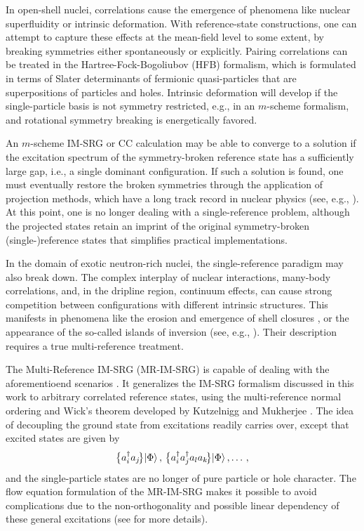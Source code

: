 In open-shell nuclei, correlations cause the emergence of phenomena
like nuclear superfluidity or intrinsic deformation. With
reference-state constructions, one can attempt to capture these
effects at the mean-field level to some extent, by breaking symmetries
either spontaneously or explicitly. Pairing correlations can be
treated in the Hartree-Fock-Bogoliubov (HFB) formalism, which is
formulated in terms of Slater determinants of fermionic
quasi-particles that are superpositions of particles and
holes. Intrinsic deformation will develop if the single-particle basis
is not symmetry restricted, e.g., in an $m$-scheme formalism, and
rotational symmetry breaking is energetically favored.

An $m$-scheme IM-SRG or CC calculation may be able to converge to a
solution if the excitation spectrum of the symmetry-broken reference
state has a sufficiently large gap, i.e., a single dominant
configuration. If such a solution is found, one must eventually
restore the broken symmetries through the application of projection
methods, which have a long track record in nuclear physics (see, e.g.,
\cite{Peierls:1973fk,Ring:1980bb,Egido:1982sd,Robledo:1994qf,Flocard:1997fx,Sheikh:2000xx,Dobaczewski:2007hh,Bender:2009rv,Duguet:2009ph,Lacroix:2009aj,Lacroix:2012vn,Duguet:2015ye}). At
this point, one is no longer dealing with a single-reference problem,
although the projected states retain an imprint of the original
symmetry-broken (single-)reference states that simplifies practical
implementations.

In the domain of exotic neutron-rich nuclei, the single-reference
paradigm may also break down. The complex interplay of nuclear
interactions, many-body correlations, and, in the dripline region,
continuum effects, can cause strong competition between configurations
with different intrinsic structures. This manifests in phenomena like
the erosion and emergence of shell closures
\cite{Wienholtz:2013bh,Holt:2014vn,Soma:2014eu,Hergert:2014vn}, or the
appearance of the so-called islands of inversion (see, e.g.,
\cite{Brown:2010xr}). Their description requires a true
multi-reference treatment.

The Multi-Reference IM-SRG (MR-IM-SRG) is capable of dealing with the
aforementioend scenarios
\cite{Hergert:2013ij,Hergert:2014vn,Hergert:2015qd}. It generalizes
the IM-SRG formalism discussed in this work to arbitrary correlated
reference states, using the multi-reference normal ordering and Wick's
theorem developed by Kutzelnigg and Mukherjee
\cite{Kutzelnigg:1997fk,Mukherjee:1997yg}. The idea of decoupling the
ground state from excitations readily carries over, except that
excited states are given by
\begin{equation*}
\big\{a^\dag_ia_j\!\big\}\!\ket{\Phi},\,\big\{a^\dag_ia^\dag_ja_la_k\!\big\}\!\ket{\Phi},\ldots\,,
\end{equation*}
and the single-particle states are no longer of pure particle or hole
character.  The flow equation formulation of the MR-IM-SRG makes it
possible to avoid complications due to the non-orthogonality and
possible linear dependency of these general excitations (see
\cite{Hergert:2015qd} for more details).

